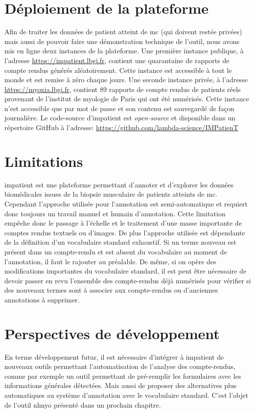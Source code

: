 \section{Déploiement de la plateforme}
Afin de traiter les données de patient atteint de \gls{mc} (qui doivent restée privées) mais aussi de pouvoir faire une démonstration technique de l'outil, nous avons mis en ligne deux instances de la plateforme. Une première instance publique, à l'adresse \href{https://impatient.lbgi.fr}{https://impatient.lbgi.fr}, contient une quarantaine de rapports de compte rendus générés aléatoirement. Cette instance est accessible à tout le monde et est remise à zéro chaque jours. Une seconde instance privée, à l'adresse \href{https://myoxia.lbgi.fr}{https://myoxia.lbgi.fr}, contient 89 rapports de compte rendus de patients réels provenant de l'institut de myologie de Paris qui ont été numérisés. Cette instance n'est accessible que par mot de passe et son contenu est sauvegardé de façon journalière. Le code-source d'\gls{impatient} est \textit{open-source} et disponible dans un répertoire GitHub à l'adresse: \href{https://github.com/lambda-science/IMPatienT}{https://github.com/lambda-science/IMPatienT}
\section{Limitations}
\gls{impatient} est une plateforme permettant d'annoter et d'explorer les données biomédicales issues de la biopsie musculaire de patients atteints de \gls{mc}. Cependant l'approche utilisée pour l'annotation est semi-automatique et requiert donc toujours un travail manuel et humain d'annotation. Cette limitation empêche donc le passage à l'échelle et le traitement d'une masse importante de comptes rendus textuels ou d'images. De plus l'approche utilisée est dépendante de la définition d'un vocabulaire standard exhaustif. Si un terme nouveau est présent dans un compte-rendu et est absent du vocabulaire au moment de l'annotation, il faut le rajouter au préalable. De même, si on opère des modifications importantes du vocabulaire standard, il est peut être nécessaire de devoir passer en revu l'ensemble des compte-rendus déjà numérisés pour vérifier si des nouveaux termes sont à associer aux compte-rendus ou d'anciennes annotations à supprimer.
\section{Perspectives de développement}
En terme développement futur, il est nécessaire d'intégrer à \gls{impatient}  de nouveaux outils permettant l'automatisation de l'analyse des compte-rendus, comme par exemple un outil permettant de pré-remplir les formulaires avec les informations générales détectées. Mais aussi de proposer des alternatives plus automatiques au système d'annotation avec le vocabulaire standard. C'est l'objet de l'outil \gls{nlmyo} présenté dans un prochain chapitre.

